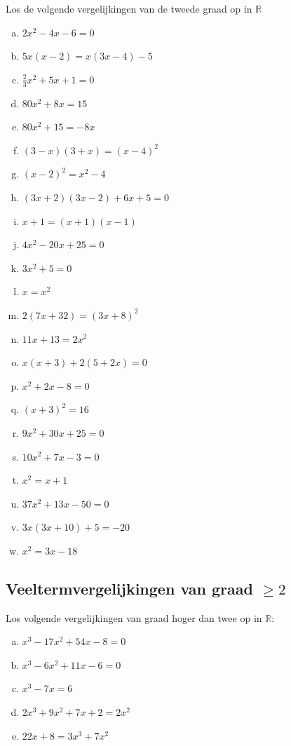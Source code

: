 \documentclass[12pt]{article}
\begin{document}
\begin{oefening}
Los de volgende vergelijkingen van de tweede graad op in $\mathbb{R}$
\begin{enumerate}[(a)]
  \itemsep0.7em
  \item $2x^2-4x-6=0$
  \item $5x(x-2)=x(3x-4)-5$
  \item $\frac{2}{3}x^2+5x+1=0$
  \item $80x^2+8x=15$
  \item $80x^2+15=-8x$
  \item $(3-x)(3+x)=(x-4)^2$
  \item $(x-2)^2=x^2-4$
  \item $(3x+2)(3x-2)+6x+5=0$
  \item $x+1=(x+1)(x-1)$
  \item $4x^2-20x+25=0$
  \item $3x^2+5=0$
  \item $x=x^2$
  \item $2\left(7x+32\right)=(3x+8)^2$
  \item $11x+13=2x^2$
  \item $x\left(x+3\right)+2\left(5+2x\right)=0$
  \item $x^2+2x-8=0$
  \item $(x+3)^2=16$
  \item $9x^2+30x+25=0$
  \item $10x^2+7x-3=0$
  \item $x^2=x+1$
  \item $37x^2+13x-50=0$
  \item $3x(3x+10)+5=-20$
  \item $x^2=3x-18$
\end{enumerate}
\end{oefening}

\subsection{Veeltermvergelijkingen van graad $\geq 2$}

\begin{oefening} %
Los volgende vergelijkingen van graad hoger dan twee op in $\mathbb{R}$:
\begin{enumerate}[(a)]
  \itemsep1em
  \item $x^3-17x^2+54x-8=0$
  \item $x^3-6x^2+11x-6=0$
  \item $x^3-7x=6$
  \item $2x^3+9x^2+7x+2=2x^2$
  \item $22x+8=3x^3+7x^2$
\end{enumerate}
\end{oefening}
\end{document}
